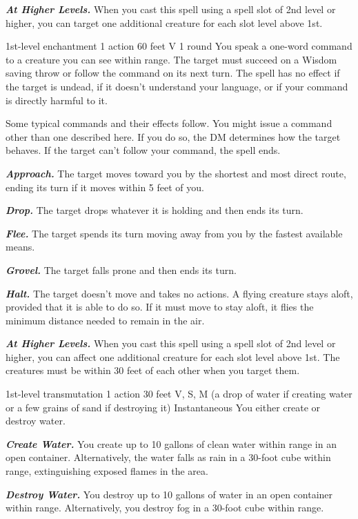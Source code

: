 \documentclass[10pt,twoside,twocolumn,openany]{book}
\newcommand\impact[1]{
	\textbf{\textit{#1}}
}
\begin{document}
\impact{At Higher Levels.} When you cast this spell using a spell slot of 2nd level or higher, you can target one additional creature for each slot level above 1st.

{1st-level enchantment}
{\color{action} 1 action}
{60 feet}
{V}
{1 round}
%
You speak a one-word command to a creature you can see within range. The target must succeed on a Wisdom saving throw or follow the command on its next turn. The spell has no effect if the target is undead, if it doesn't understand your language, or if your command is directly harmful to it.

Some typical commands and their effects follow. You might issue a command other than one described here. If you do so, the DM determines how the target behaves. If the target can't follow your command, the spell ends.

\impact{Approach.} The target moves toward you by the shortest and most direct route, ending its turn if it moves within 5 feet of you.

\impact{Drop.} The target drops whatever it is holding and then ends its turn.

\impact{Flee.} The target spends its turn moving away from you by the fastest available means.

\impact{Grovel.} The target falls prone and then ends its turn.

\impact{Halt.} The target doesn't move and takes no actions. A flying creature stays aloft, provided that it is able to do so. If it must move to stay aloft, it flies the minimum distance needed to remain in the air.

\impact{At Higher Levels.} When you cast this spell using a spell slot of 2nd level or higher, you can affect one additional creature for each slot level above 1st. The creatures must be within 30 feet of each other when you target them.

{1st-level transmutation}
{\color{action} 1 action}
{30 feet}
{V, S, M (a drop of water if creating water or a few grains of sand if destroying it)}
{Instantaneous}
%
You either create or destroy water.

\impact{Create Water.} You create up to 10 gallons of clean
water within range in an open container. Alternatively, the water falls as rain in a 30-foot cube within range, extinguishing exposed flames in the area.

\impact{Destroy Water.} You destroy up to 10 gallons of water in an open container within range. Alternatively, you destroy fog in a 30-foot cube within range.
\end{document}

